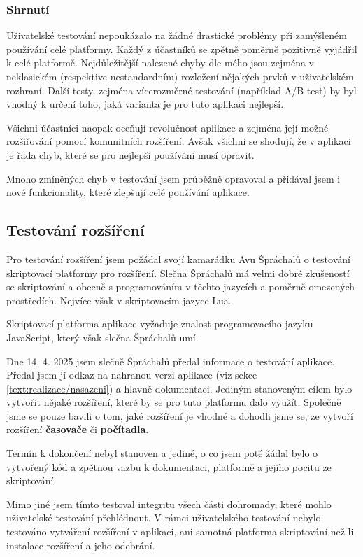 \subsubsection{Shrnutí}

Uživatelské testování nepoukázalo na žádné drastické problémy při zamýšleném používání celé platformy.
Každý z účastníků se zpětně poměrně pozitivně vyjádřil k celé platformě.
Nejdůležitější nalezené chyby dle mého jsou zejména v neklasickém (respektive nestandardním) rozložení nějakých prvků v uživatelském rozhraní.
Další testy, zejména vícerozměrné testování (například A/B test) by byl vhodný k určení toho, jaká varianta je pro tuto aplikaci nejlepší.

Všichni účastníci naopak oceňují revolučnost aplikace a zejména její možné rozšiřování pomocí komunitních rozšíření.
Avšak všichni se shodují, že v aplikaci je řada chyb, které se pro nejlepší používání musí opravit.

Mnoho zmíněných chyb v testování jsem průběžně opravoval a přidával jsem i nové funkcionality, které zlepšují celé používání aplikace. 

\subsection{Testování rozšíření}\label{text:testovani/rozsireni}

Pro testování rozšíření jsem požádal svojí kamarádku Avu Špráchalů o testování skriptovací platformy pro rozšíření.
Slečna Špráchalů má velmi dobré zkušeností se skriptování a obecně s programováním v těchto jazycích a poměrně omezených prostředích.
Nejvíce však v skriptovacím jazyce Lua.

Skriptovací platforma aplikace vyžaduje znalost programovacího jazyku JavaScript, který však slečna Špráchalů umí.

Dne 14. 4. 2025 jsem slečně Špráchalů předal informace o testování aplikace.
Předal jsem jí odkaz na nahranou verzi aplikace (viz sekce \ref{text:realizace/nasazeni}) a hlavně dokumentaci.
Jediným stanoveným cílem bylo vytvořit nějaké rozšíření, které by se pro tuto platformu dalo využít.
Společně jsme se pouze bavili o tom, jaké rozšíření je vhodné a dohodli jsme se, ze vytvoří rozšíření \textbf{časovače} či \textbf{počítadla}.

Termín k dokončení nebyl stanoven a jediné, o co jsem poté žádal bylo o vytvořený kód a zpětnou vazbu k dokumentaci, platformě a jejího pocitu ze skriptování.

Mimo jiné jsem tímto testoval integritu všech části dohromady, které mohlo uživatelské testování přehlédnout.
V rámci uživatelského testování nebylo testováno vytváření rozšíření v aplikaci, ani samotná platforma skriptování než-li instalace rozšíření a jeho odebrání.

